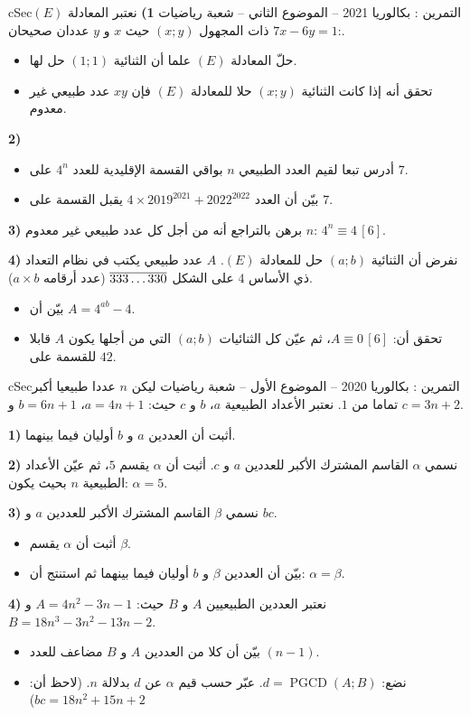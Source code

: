 \documentclass[12pt,a4paper]{article}
\newenvironment{BOX}[2]{\begin{otherlanguage}{english}\begin{arbox}{#1}{#2}}{\end{arbox}\end{otherlanguage}}
\newcounter{exo}
\newenvironment{tamrin}[1]{\stepcounter{exo}\begin{BOX}{cSec}{التمرين \theexo: #1}}{\end{BOX}}
\renewcommand{\ldots}{\mathinner{\ldotp\ldotp\ldotp}}
\newcommand{\pgcd}{\operatorname{PGCD}}
\newenvironment{sq}{\begin{itemize}[leftmargin=2.4em,itemsep=3pt]}{\end{itemize}}
\newcommand{\qa}{\item[(أ)]}\newcommand{\qb}{\item[(ب)]}\newcommand{\qc}{\item[(جـ)]}\newcommand{\qd}{\item[(د)]}\newcommand{\qe}{\item[(هـ)]}
\begin{document}
\begin{tamrin}{بكالوريا 2021 -- الموضوع الثاني -- شعبة رياضيات}
\textbf{1)} نعتبر المعادلة $(E)$:\quad $7x-6y=1$ ذات المجهول $(x;y)$ حيث $x$ و $y$ عددان صحيحان.
\begin{sq}
\qa حلّ المعادلة $(E)$ علما أن الثنائية $(1;1)$ حل لها.
\qb تحقق أنه إذا كانت الثنائية $(x;y)$ حلا للمعادلة $(E)$ فإن $xy$ عدد طبيعي غير معدوم.
\end{sq}
\textbf{2)}
\begin{sq}
\qa أدرس تبعا لقيم العدد الطبيعي $n$ بواقي القسمة الإقليدية للعدد $4^n$ على $7$.
\qb بيّن أن العدد $4\times2019^{2021}+2022^{2022}$ يقبل القسمة على $7$.
\end{sq}
\textbf{3)} برهن بالتراجع أنه من أجل كل عدد طبيعي غير معدوم $n$: $4^n\equiv4\,[6]$.

\textbf{4)} نفرض أن الثنائية $(a;b)$ حل للمعادلة $(E)$.
$A$ عدد طبيعي يكتب في نظام التعداد ذي الأساس $4$ على الشكل $\overline{333\ldots330}$ (عدد أرقامه $a\times b$).
\begin{sq}
\qa بيّن أن $A=4^{ab}-4$.
\qb تحقق أن: $A\equiv0\,[6]$، ثم عيّن كل الثنائيات $(a;b)$ التي من أجلها يكون $A$ قابلا للقسمة على $42$.
\end{sq}
\end{tamrin}

\begin{tamrin}{بكالوريا 2020 -- الموضوع الأول -- شعبة رياضيات}
ليكن $n$ عددا طبيعيا أكبر تماما من $1$.
نعتبر الأعداد الطبيعية $a$، $b$ و $c$ حيث: $a=4n+1$، $b=6n+1$ و $c=3n+2$.

\textbf{1)} أثبت أن العددين $a$ و $b$ أوليان فيما بينهما.

\textbf{2)} نسمي $\alpha$ القاسم المشترك الأكبر للعددين $a$ و $c$.
أثبت أن $\alpha$ يقسم $5$، ثم عيّن الأعداد الطبيعية $n$ بحيث يكون: $\alpha=5$.

\textbf{3)} نسمي $\beta$ القاسم المشترك الأكبر للعددين $a$ و $bc$.
\begin{sq}
\qa أثبت أن $\alpha$ يقسم $\beta$.
\qb بيّن أن العددين $\beta$ و $b$ أوليان فيما بينهما ثم استنتج أن: $\alpha=\beta$.
\end{sq}
\textbf{4)} نعتبر العددين الطبيعيين $A$ و $B$ حيث: $A=4n^2-3n-1$ و $B=18n^3-3n^2-13n-2$.
\begin{sq}
\qa بيّن أن كلا من العددين $A$ و $B$ مضاعف للعدد $(n-1)$.
\qb نضع: $d=\pgcd(A;B)$. عبّر حسب قيم $\alpha$ عن $d$ بدلالة $n$. (لاحظ أن: $bc=18n^2+15n+2$)
\end{sq}
\end{tamrin}
\end{document}
